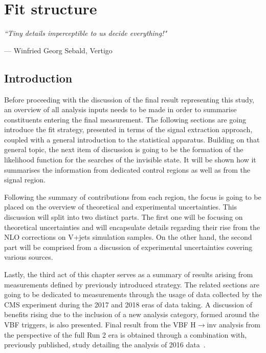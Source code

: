 \chapter{Fit structure}
\label{ch:fit}
\epigraph{\itshape``Tiny details imperceptible to us decide everything!"}{--- \textup{Winfried Georg Sebald, Vertigo}}

\section{Introduction}
\hspace{10pt} Before proceeding with the discussion of the final result representing this study, an overview of all analysis inputs needs to be made in order to summarise constituents entering the final measurement. The following sections are going introduce the fit strategy, presented in terms of the signal extraction approach, coupled with a general introduction to the statistical apparatus. Building on that general topic, the next item of discussion is going to be the formation of the likelihood function for the searches of the invisible state. It will be shown how it summarises the information from dedicated control regions as well as from the signal region.

\hspace{10pt} Following the summary of contributions from each region, the focus is going to be placed on the overview of theoretical and experimental uncertainties. This discussion will split into two distinct parts. The first one will be focusing on theoretical uncertainties and will encapsulate details regarding their rise from the NLO corrections on V+jets simulation samples. On the other hand, the second part will be comprised from a discussion of experimental uncertainties covering various sources.


\hspace{10pt} Lastly, the third act of this chapter serves as a summary of results arising from measurements defined by previously introduced strategy. The related sections are going to be dedicated to measurements through the usage of data collected by the CMS experiment during the 2017 and 2018 eras of data taking. A discussion of benefits rising due to the inclusion of a new analysis category, formed around the VBF triggers, is also presented. Final result from the VBF H$\rightarrow$inv analysis from the perspective of the full Run 2 era is obtained through a combination with, previously published, study detailing the analysis of 2016 data~\cite{paper:HIG_17_023}.
